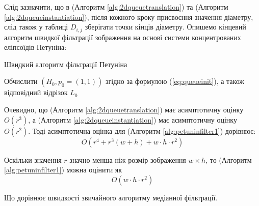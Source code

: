 \par
Слід зазначити, що в (Алгоритм \ref{alg:2dqueuetranslation}) та (Алгоритм \ref{alg:2dqueueinstantiation}), після кожного кроку присвоєння значення діаметру, слід також у таблиці \(D_{i, j}\) зберігати точки кінців діаметру. Опишемо кінцевий алгоритм швидкої фільтрації зображення на основі системи концентрованих еліпсоїдів Петуніна:

\begin{megaalgorithm}[H] \label{alg:petuninfilter1}
	\caption{Швидкий алгоритм фільтрації Петуніна}
	
	\BlankLine 
	
	Обчислити \((H_0, p_0 = (1, 1))\) згідно за формулою (\ref{eq:queueinit}), а також відповідний відрізок \(L_0\)\;

\end{megaalgorithm}

\par
Очевидно, що (Алгоритм \ref{alg:2dqueuetranslation}) має асимптотичну оцінку \(O\left( r^3 \right)\), а (Алгоритм \ref{alg:2dqueueinstantiation}) має асимптотичну оцінку \(O\left(r^2\right)\). Тоді асимптотична оцінка для (Алгоритм \ref{alg:petuninfilter1}) дорівнює:
\begin{equation*}
O\left(
r^4 + r^3 \left(w + h\right) + w \cdot h \cdot r^2
\right)
\end{equation*}

Оскільки значення \(r\) значно менша ніж розмір зображення \(w \times h\), то (Алгоритм \ref{alg:petuninfilter1}) можна оцінити як
\begin{equation*}
O\left(w \cdot h \cdot r^2\right)
\end{equation*}

Що дорівнює швидкості звичайного алгоритму медіанної фільтрації.